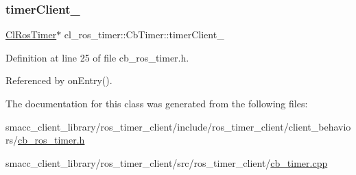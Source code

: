 \subsubsection{\texorpdfstring{timer\+Client\+\_\+}{timerClient\_}}
{\footnotesize\ttfamily \hyperlink{classcl__ros__timer_1_1ClRosTimer}{Cl\+Ros\+Timer}$\ast$ cl\+\_\+ros\+\_\+timer\+::\+Cb\+Timer\+::timer\+Client\+\_\+\hspace{0.3cm}{\ttfamily [private]}}



Definition at line 25 of file cb\+\_\+ros\+\_\+timer.\+h.



Referenced by on\+Entry().



The documentation for this class was generated from the following files\+:\begin{DoxyCompactItemize}
\item 
smacc\+\_\+client\+\_\+library/ros\+\_\+timer\+\_\+client/include/ros\+\_\+timer\+\_\+client/client\+\_\+behaviors/\hyperlink{cb__ros__timer_8h}{cb\+\_\+ros\+\_\+timer.\+h}\item 
smacc\+\_\+client\+\_\+library/ros\+\_\+timer\+\_\+client/src/ros\+\_\+timer\+\_\+client/\hyperlink{cb__timer_8cpp}{cb\+\_\+timer.\+cpp}\end{DoxyCompactItemize}
